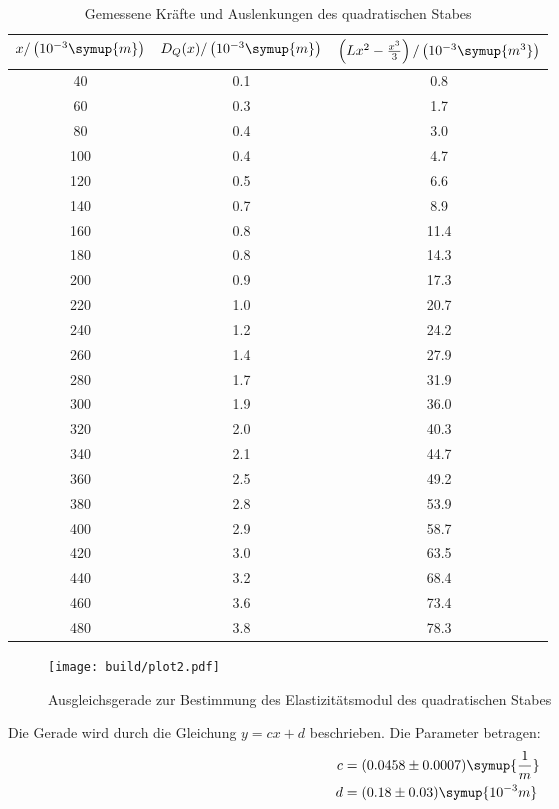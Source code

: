 \begin{table}[H]
  \centering
  \caption{Gemessene Kräfte und Auslenkungen des quadratischen Stabes}
  \label{tab:quadratischer Stab}
  \begin{tabular}{c c c}
    \toprule
    $x/\left(10^{-3}\symup{m}\right)$ & $D_Q(x)/\left(10^{-3}\symup{m}\right)$ & $\left(Lx^2 -\frac{x^3}{3}\right)/\left(10^{-3}\symup{m^3}\right)$\\
    \midrule
     40 & 0.1 &  0.8 \\
     60 & 0.3 &  1.7 \\
     80 & 0.4 &  3.0 \\
    100 & 0.4 &  4.7 \\
    120 & 0.5 &  6.6 \\
    140 & 0.7 &  8.9 \\
    160 & 0.8 & 11.4 \\
    180 & 0.8 & 14.3 \\
    200 & 0.9 & 17.3 \\
    220 & 1.0 & 20.7 \\
    240 & 1.2 & 24.2 \\
    260 & 1.4 & 27.9 \\
    280 & 1.7 & 31.9 \\
    300 & 1.9 & 36.0 \\
    320 & 2.0 & 40.3 \\
    340 & 2.1 & 44.7 \\
    360 & 2.5 & 49.2 \\
    380 & 2.8 & 53.9 \\
    400 & 2.9 & 58.7 \\
    420 & 3.0 & 63.5 \\
    440 & 3.2 & 68.4 \\
    460 & 3.6 & 73.4 \\
    480 & 3.8 & 78.3 \\
    \bottomrule
  \end{tabular}
\end{table}

\begin{figure}[H]
  \centering
  \texttt{[image: build/plot2.pdf]}
  \caption{Ausgleichsgerade zur Bestimmung des Elastizitätsmodul des quadratischen Stabes}
  \label{fig:Elastizitätsmodul des quadratischen Stabes}
\end{figure}

Die Gerade wird durch die Gleichung $y = cx + d$ beschrieben. Die Parameter betragen:
\begin{align*}
  c &= (0.0458 \pm 0.0007) \symup{\frac{1}{m}} \\
  d &= (0.18  \pm 0.03)    \symup{10^{-3}m}
\end{align*}



